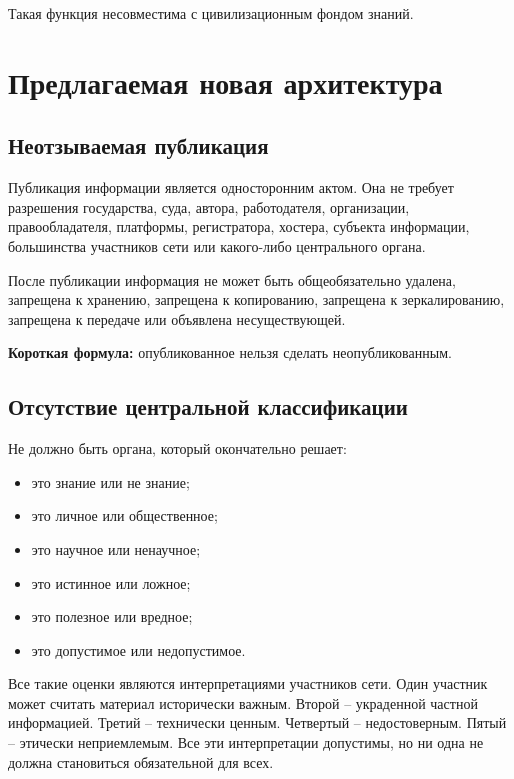 \documentclass[11pt,a4paper]{article}
\begin{document}
Такая функция несовместима с цивилизационным фондом знаний.

\section{Предлагаемая новая архитектура}

\subsection{Неотзываемая публикация}

Публикация информации является односторонним актом. Она не требует разрешения государства, суда, автора, работодателя, организации, правообладателя, платформы, регистратора, хостера, субъекта информации, большинства участников сети или какого-либо центрального органа.

После публикации информация не может быть общеобязательно удалена, запрещена к хранению, запрещена к копированию, запрещена к зеркалированию, запрещена к передаче или объявлена несуществующей.

\begin{executivebox}
\textbf{Короткая формула:} опубликованное нельзя сделать неопубликованным.
\end{executivebox}

\subsection{Отсутствие центральной классификации}

Не должно быть органа, который окончательно решает:

\begin{itemize}
  \item это знание или не знание;
  \item это личное или общественное;
  \item это научное или ненаучное;
  \item это истинное или ложное;
  \item это полезное или вредное;
  \item это допустимое или недопустимое.
\end{itemize}

Все такие оценки являются интерпретациями участников сети. Один участник может считать материал исторически важным. Второй -- украденной частной информацией. Третий -- технически ценным. Четвертый -- недостоверным. Пятый -- этически неприемлемым. Все эти интерпретации допустимы, но ни одна не должна становиться обязательной для всех.
\end{document}

